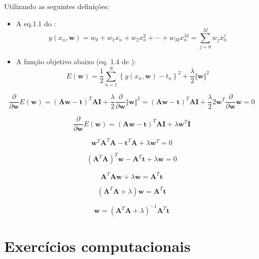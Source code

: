 \documentclass{article}
\begin{document}
  Utilizando as seguintes definições:
  
  \begin{itemize}
  	\item  A eq.1.1  do \cite{Bishop2006}:
  	\begin{equation}
  		y(x_{n},\mathbf{w})=w_{0}+w_{1}x_{n}+w_{2}x_{n}^{2}+\cdots+w_{M}x_{n}^{M}=\sum_{j=0}^{M}w_{j}x_{n}^{j}                               
  	\end{equation}
  	
  	\item A função objetivo abaixo (eq. 1.4 de \cite{Bishop2006}):
  	\begin{equation}
  		E(\mathbf{w})=\frac{1}{2}\sum_{n=1}^{N}\left\{ y\left(x_{n},\mathbf{w}\right)-t_{n}\right\} ^{2}+\frac{\lambda}{2}\Vert \mathbf{w}\Vert^{2}                               \label{eq101_ML}
  	\end{equation}  	
  \end{itemize}
  
  
   \[
  \frac{\partial}{\partial \mathbf{w}} E(\mathbf{w}) =   \left( \mathbf{A} \mathbf{w} -\mathbf{t} \right)^{T} \mathbf{A} \mathbf{I} + \frac{\lambda}{2}  \frac{\partial}{\partial \mathbf{w}} \Vert \mathbf{w}\Vert^{2} =  \left( \mathbf{A} \mathbf{w} -\mathbf{t} \right)^{T} \mathbf{A} \mathbf{I} + \frac{\lambda}{2} 2 \mathbf{w}^{T} \frac{\partial}{\partial \mathbf{w}}  \mathbf{w} = 0
   \]
  
  \[
   \frac{\partial}{\partial \mathbf{w}} E(\mathbf{w}) = \left( \mathbf{A} \mathbf{w} -\mathbf{t} \right)^{T} \mathbf{A} \mathbf{I} + \lambda \mathbf{w}^{T} \mathbf{I}
  \]
   
   
  \[
  \mathbf{w}^{T} \mathbf{A}^{T}\mathbf{A}   -\mathbf{t}^{T}\mathbf{A} +  \lambda \mathbf{w}^{T} = 0
  \]
  
  \[
  (\mathbf{A}^{T}\mathbf{A})^{T}\mathbf{w} -\mathbf{A}^{T}\mathbf{t}  + \lambda \mathbf{w} =  0
  \]
  
  \[
    \mathbf{A}^{T}\mathbf{A}\mathbf{w}  + \lambda \mathbf{w} = \mathbf{A}^{T}\mathbf{t} 
  \]
  
   \[
    (\mathbf{A}^{T}\mathbf{A}  + \lambda) \mathbf{w} = \mathbf{A}^{T}\mathbf{t} 
   \]
   
   \[
    \mathbf{w} =  (\mathbf{A}^{T}\mathbf{A}  + \lambda)^{-1} \mathbf{A}^{T}\mathbf{t} 
   \]

\section{Exerc\'icios computacionais}
\end{document}
